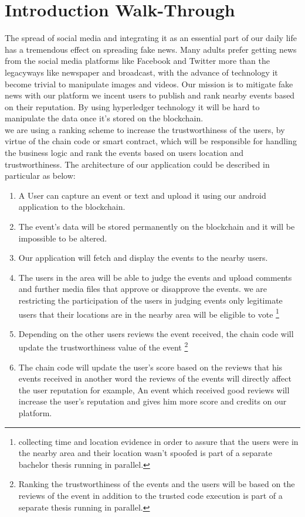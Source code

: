	\section{Introduction Walk-Through}
	The spread of social media and integrating it as an essential part of our daily life has a tremendous effect on spreading fake news. Many adults prefer getting news from the social media platforms like Facebook and Twitter more than the legacyways like newspaper and broadcast, with the advance of technology it become trivial to manipulate images and videos.   
	Our mission is to mitigate fake news with our platform we incent users to publish and rank nearby events based on their reputation. By using hyperledger technology it will be hard to manipulate the data once it's stored on the blockchain.\\ we are using a ranking scheme to increase the trustworthiness of the users, by virtue of the chain code or smart contract, which will be responsible for handling the business logic and rank the events based on users location and  trustworthiness. The architecture of our application could be described in particular as below: 	 

       \begin{enumerate}
	 \item {A User can capture an event or text and upload it using our android application to the blockchain.}
	 \item {The event's data will be stored permanently on the blockchain and it will be impossible to be altered.} 
	 \item {Our application will fetch and display the events to the nearby users.} 
         \item {The users in the area will be able to judge the events and upload comments and further media files that approve or disapprove the events.  we are restricting the participation of the users in judging events only legitimate users that their locations are in the nearby area will be eligible to vote \footnote[1]{collecting time and location evidence in order to assure that the users were in the nearby area and their location wasn't spoofed  is part of a separate bachelor thesis running in parallel.} }
         \item {Depending on the other users reviews the event received, the chain code will update the trustworthiness value of the event \footnote[2]{Ranking the trustworthiness of the events and the users will be based on the reviews of the event in addition to the trusted code execution is part of a separate thesis running in parallel. } }
          \item {The chain code will update the user's score based on the reviews that his events received in another word the reviews of the events will directly affect the user reputation for example, An event which received good reviews will increase the user's reputation and gives him more score and credits on our platform.} 
	\end{enumerate}


